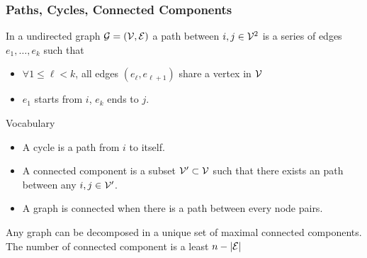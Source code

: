 \documentclass{beamer}\usepackage[]{graphicx}\usepackage[]{color}
\begin{document}
\begin{frame}
  \frametitle{Paths, Cycles, Connected Components}

  \begin{definition}[Path]
    In a undirected graph $\mathcal{G} = (\mathcal{V},\mathcal{E})$ a path  between $i,j\in \mathcal{V}^2$ is a series of edges $e_1,\dots,e_k$ such that
    \begin{itemize}
      \item  $\forall 1 \leq \ell < k$, all edges $(e_\ell, e_{\ell+1})$ share a vertex in $\mathcal{V}$
      \item  $e_1$ starts from $i$, $e_k$ ends to $j$.
    \end{itemize}
  \end{definition}

    \vspace{-.15cm}

  \begin{block}{Vocabulary}
    \vspace{-.25cm}
    \begin{itemize}
    \item  A \alert{cycle} is a path from $i$ to itself.
    \item  A \alert{connected component} is a subset $\mathcal{V}'\subset\mathcal{V}$ such that there exists an path between any $i,j\in\mathcal{V}'$.
    \item A graph is \alert{connected} when there is a path between every node pairs.
    \end{itemize}
  \end{block}

    \vspace{-.15cm}

  \begin{proposition}[Decomposition]
    Any graph can be decomposed in a unique set of maximal connected components. The number of connected component is a least $n - |\mathcal{E}|$
  \end{proposition}

\end{frame}
\end{document}
